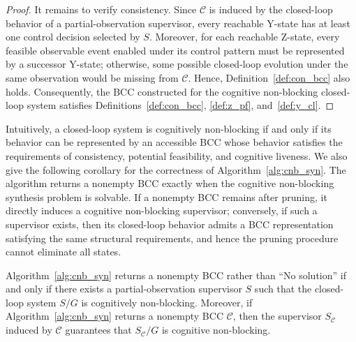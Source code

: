\documentclass[journal,twoside,web]{ieeecolor}
\begin{document}
\begin{proof}
It remains to verify consistency. Since ${\mathcal{C}}$ is induced by the closed-loop behavior of a partial-observation supervisor, every reachable Y-state has at least one control decision selected by $S$. 
Moreover, for each reachable Z-state, every feasible observable event enabled under its control pattern must be represented by a successor Y-state; otherwise, some possible
closed-loop evolution under the same observation would be missing from $\mathcal C$. 
Hence, Definition~\ref{def:con_bcc} also holds.
%
Consequently, the BCC constructed for the cognitive non-blocking closed-loop system satisfies Definitions~\ref{def:con_bcc}, \ref{def:z_pf}, and~\ref{def:y_cl}.
\end{proof}

Intuitively, a closed-loop system is cognitively non-blocking if and only if its behavior can be represented by an accessible BCC whose behavior satisfies the requirements of consistency, potential feasibility, and cognitive liveness.
%
We also give the following corollary for the correctness of Algorithm~\ref{alg:cnb_syn}.
The algorithm returns a nonempty BCC exactly when the cognitive non-blocking synthesis problem is solvable. 
If a nonempty BCC remains after pruning, it directly induces a cognitive non-blocking supervisor; conversely, if such a supervisor exists, then its closed-loop behavior admits a BCC representation satisfying the same structural requirements, and hence the pruning procedure cannot eliminate all states.

\begin{corollary}\label{cor:alg_cnb_sound}
Algorithm~\ref{alg:cnb_syn} returns a nonempty BCC rather than ``No solution'' if and only if there exists a partial-observation supervisor $S$ such that the closed-loop system $S/G$ is cognitively non-blocking.
%
Moreover, if Algorithm~\ref{alg:cnb_syn} returns a nonempty BCC $\mathcal{C}$, then the supervisor $S_{\mathcal{C}}$ induced by $\mathcal{C}$ guarantees that $S_{\mathcal{C}}/G$ is cognitive non-blocking.
\end{corollary}
\end{document}

